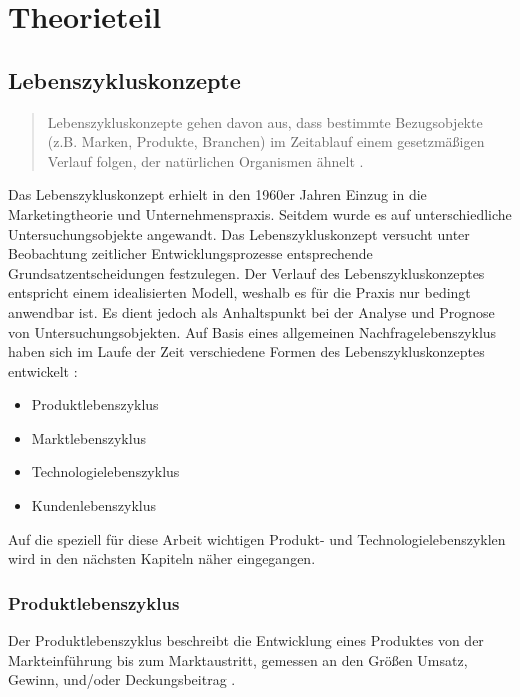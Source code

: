 \chapter{Theorieteil}

\thispagestyle{standard}
\pagestyle{standard}

\section{Lebenszykluskonzepte}

\begin{quote}
Lebenszykluskonzepte gehen davon aus, dass bestimmte Bezugsobjekte (z.B. Marken, Produkte, Branchen) im Zeitablauf einem gesetzmäßigen Verlauf folgen, der natürlichen Organismen ähnelt \upshape \cite[S. 61]{Bru06}.
\end{quote}

Das Lebenszykluskonzept erhielt in den 1960er Jahren Einzug in die Marketingtheorie und Unternehmenspraxis. Seitdem wurde es auf unterschiedliche Untersuchungsobjekte angewandt. Das Lebenszykluskonzept versucht unter Beobachtung zeitlicher Entwicklungsprozesse entsprechende Grundsatzentscheidungen festzulegen. Der Verlauf des Lebenszykluskonzeptes entspricht einem idealisierten Modell, weshalb es für die Praxis nur bedingt anwendbar ist. Es dient jedoch als Anhaltspunkt bei der Analyse und Prognose von Untersuchungsobjekten. 
Auf Basis eines allgemeinen Nachfragelebenszyklus haben sich im Laufe der Zeit verschiedene Formen des Lebenszykluskonzeptes entwickelt \cite{Bru06}:

\begin{itemize}[noitemsep]
\item Produktlebenszyklus
\item Marktlebenszyklus
\item Technologielebenszyklus
\item Kundenlebenszyklus 
\end{itemize}

Auf die speziell für diese Arbeit wichtigen Produkt- und Technologielebenszyklen wird in den nächsten Kapiteln näher eingegangen.

\subsection{Produktlebenszyklus}

Der Produktlebenszyklus beschreibt die Entwicklung eines Produktes von der Markteinführung bis zum Marktaustritt, gemessen an den Größen Umsatz, Gewinn, und/oder Deckungsbeitrag \cite{Pep99}. 

